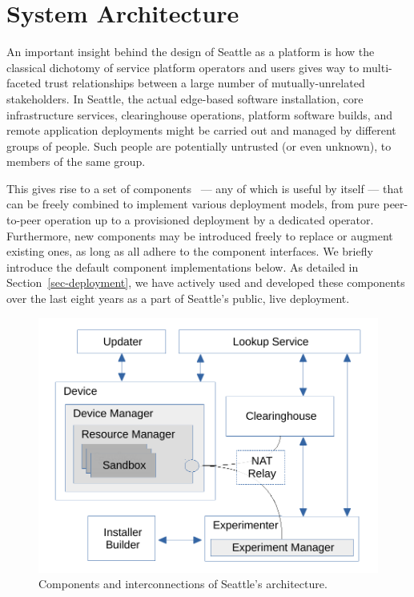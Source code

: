 \section{System Architecture}

An important insight behind the design of Seattle as a platform
is how the classical
dichotomy of service platform operators and users gives way to multi-faceted
trust relationships between a large number of mutually-unrelated
stakeholders.
In Seattle, the actual edge-based software installation, core infrastructure
services, clearinghouse operations, platform software builds, and remote
application deployments might be carried out and managed by different
groups of people. Such people are potentially untrusted (or even unknown),
to members of the same group.

This gives rise to a set of components~\cite{Cappos2009} ---
any of which is useful
by itself --- that can be freely combined to implement various
deployment models, from pure peer-to-peer operation up to a
provisioned deployment by a dedicated operator. Furthermore,
new components may be introduced freely to replace or augment
existing ones, as long as all adhere to the component interfaces.
We briefly introduce the default component implementations below.
As detailed in Section~\ref{sec-deployment}, we have actively used
and developed these components over the last eight years as a part of
Seattle's public, live deployment.

\begin{figure}
  \centering
  \includegraphics[width=\columnwidth]{figures/components.pdf}
  \caption{Components and interconnections of Seattle's architecture.}
  \label{fig:arch}
\end{figure}


